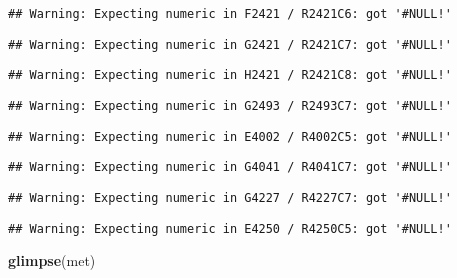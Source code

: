 \documentclass[
]{article}
\newenvironment{Shaded}{\begin{snugshade}}{\end{snugshade}}
\newcommand{\FunctionTok}[1]{\textcolor[rgb]{0.13,0.29,0.53}{\textbf{#1}}}
\newcommand{\NormalTok}[1]{#1}
\begin{document}
\begin{verbatim}
## Warning: Expecting numeric in F2421 / R2421C6: got '#NULL!'
\end{verbatim}

\begin{verbatim}
## Warning: Expecting numeric in G2421 / R2421C7: got '#NULL!'
\end{verbatim}

\begin{verbatim}
## Warning: Expecting numeric in H2421 / R2421C8: got '#NULL!'
\end{verbatim}

\begin{verbatim}
## Warning: Expecting numeric in G2493 / R2493C7: got '#NULL!'
\end{verbatim}

\begin{verbatim}
## Warning: Expecting numeric in E4002 / R4002C5: got '#NULL!'
\end{verbatim}

\begin{verbatim}
## Warning: Expecting numeric in G4041 / R4041C7: got '#NULL!'
\end{verbatim}

\begin{verbatim}
## Warning: Expecting numeric in G4227 / R4227C7: got '#NULL!'
\end{verbatim}

\begin{verbatim}
## Warning: Expecting numeric in E4250 / R4250C5: got '#NULL!'
\end{verbatim}

\begin{Shaded}
\begin{Highlighting}[]
\FunctionTok{glimpse}\NormalTok{(met)}
\end{Highlighting}
\end{Shaded}
\end{document}
